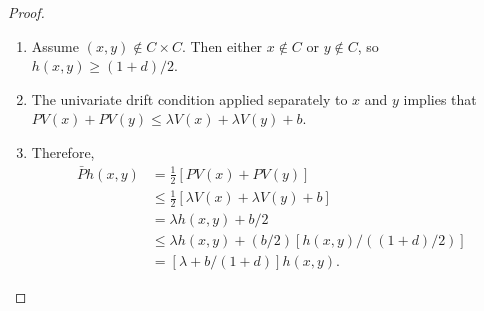 \documentclass[12pt]{article}
\begin{document}
\begin{proof}
    \begin{enumerate}
        \item
            Assume \( (x,y) \notin C \times C \).  Then either \( x
            \notin C \) or \( y \notin C \), so \( h(x,y) \ge (1 + d)/2 \).
        \item
            The univariate drift condition applied separately to \( x \)
            and \( y \) implies that \( PV(x) + PV(y) \le \lambda V(x) +
            \lambda V(y) + b \).
        \item
            Therefore,
            \begin{align*}
                \bar{P}h(x,y) &= \frac{1}{2}
                \left[ PV(x) + PV(y) \right] \\
                &\le \frac{1}{2} \left[ \lambda V(x) + \lambda V(y) + b
                \right] \\
                &= \lambda h(x,y) + b/2 \\
                &\le \lambda h(x,y) + (b/2) \left[ h(x,y)/((1+d)/2)
                \right] \\
                &= \left[ \lambda + b/(1+d) \right] h(x,y).
            \end{align*}
    \end{enumerate}
\end{proof}
\end{document}
